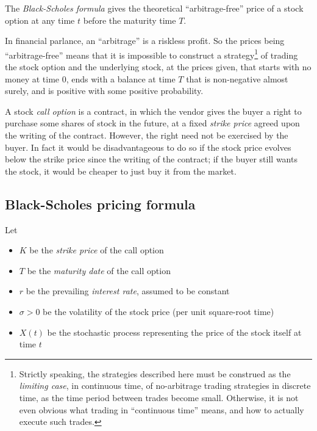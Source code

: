 \documentclass[12pt]{article}
\begin{document}

\tableofcontents

\medskip

The \emph{Black-Scholes formula}
gives the theoretical ``arbitrage-free'' price of a stock option
at any time $t$ before the maturity time $T$.

In financial parlance, an ``arbitrage'' is a riskless
profit.  So the prices being ``arbitrage-free''
means that it is impossible to construct
 a strategy\footnote{Strictly speaking, the strategies described here must be construed as the \emph{limiting case}, in continuous time, of no-arbitrage trading
strategies in discrete time, as the time period between trades become
small.  Otherwise, it is not even obvious what trading
in ``continuous time'' means, and how to actually execute such trades.}
 of trading the stock option and the underlying stock,
at the prices given,
that starts with no money at time $0$,
ends with a balance at time $T$ that
is non-negative almost surely,
and is positive 
with some positive probability.

A stock \emph{call option} is a contract, in which the vendor gives
the buyer a right to purchase some shares of stock in the future,
at a fixed \emph{strike price} agreed upon the writing of the contract.
However, the right need not be exercised by the buyer.
In fact it would be disadvantageous to do so if the stock price
evolves below the strike price since the writing of the contract;
if the buyer still wants the stock, it would be cheaper to just
buy it from the market.

\subsection{Black-Scholes pricing formula}

Let 
\begin{itemize}
\item
$K$ be the \emph{strike price} of the call option
\item
$T$ be the \emph{maturity date} of the call option
\item
$r$ be the prevailing \emph{interest rate}, assumed to be constant 
\item
$\sigma > 0$ be the volatility of the stock price (per unit square-root time)
\item
$X(t)$ be the stochastic process representing the price of the stock itself at time $t$
\end{itemize}
\end{document}
